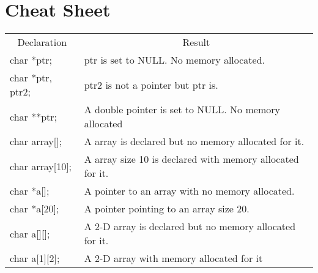 \documentclass[a4paper]{article}
\begin{document}
\section{Cheat Sheet}
\begin{table}[h]
\centering
\begin{tabular}{ll}
\multicolumn{1}{c}{Declaration} & \multicolumn{1}{c}{Result}                                \\
char *ptr;                      & ptr is set to NULL. No memory allocated.                  \\
char *ptr, ptr2;                & ptr2 is not a pointer but ptr is.                         \\
char **ptr;                     & A double pointer is set to NULL. No memory allocated      \\
char array[];                   & A array is declared but no memory allocated for it.       \\
char array[10];                 & A array size 10 is declared with memory allocated for it. \\
char *a[];                      & A pointer to an array with no memory allocated.           \\
char *a[20];                    & A pointer pointing to an array size 20.                   \\
char a[][];                     & A 2-D array is declared but no memory allocated for it.   \\
char a[1][2];                   & A 2-D array with memory allocated for it                 
\end{tabular}
\end{table}
\end{document}
